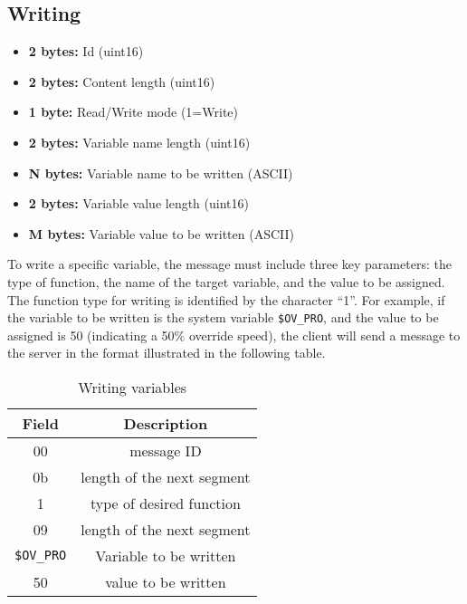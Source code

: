 \subsection{Writing}
\begin{itemize}
    \item \textbf{2 bytes:} Id (uint16)
    \item \textbf{2 bytes:} Content length (uint16)
    \item \textbf{1 byte:} Read/Write mode (1=Write)
    \item \textbf{2 bytes:} Variable name length (uint16)
    \item \textbf{N bytes:} Variable name to be written (ASCII)
    \item \textbf{2 bytes:} Variable value length (uint16)
    \item \textbf{M bytes:} Variable value to be written (ASCII)
\end{itemize}
To write a specific variable, 
the message must include three key 
parameters: the type of function, 
the name of the target variable, 
and the value to be assigned. 
The function type for writing is 
identified by the character “1”. 
For example, if the variable to be 
written is the system variable 
\texttt{\$OV\_PRO}, and the value 
to be assigned is 50 
(indicating a 50\% override speed), 
the client will send a message to the 
server in the format illustrated in the following table\cite{sanfilippo2014jopenshowvar}.
\begin{table}[h!]
    \centering
    \caption{Writing variables}
    \begin{tabular}{|c|c|}
    \hline
    \textbf{Field} & \textbf{Description} \\ \hline
    00 & message ID \\ \hline
    0b & length of the next segment \\ \hline
    1  & type of desired function \\ \hline
    09 & length of the next segment \\ \hline
    \texttt{\$OV\_PRO} & Variable to be written \\ \hline
    50 & value to be written \\ \hline
    \end{tabular}
    \end{table}

